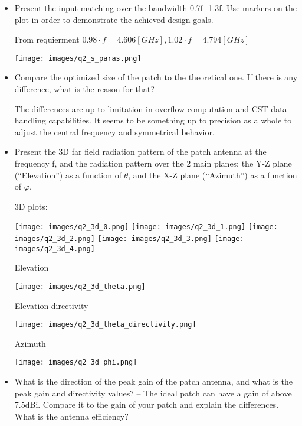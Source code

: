 \documentclass[12pt, letterpaper]{article}
\begin{document}
\begin{itemize}
  \item Present the input matching over the bandwidth 0.7f -1.3f. Use markers on the plot in order to demonstrate the achieved design goals.

  {\color{blue} From requierment $0.98\cdot f=4.606[GHz], 1.02\cdot f=4.794[GHz]$}

  \texttt{[image: images/q2\_s\_paras.png]}
  \item Compare the optimized size of the patch to the theoretical one. If there is any difference, what is the reason for that?

  {\color{blue}The differences are up to limitation in overflow computation and CST data handling capabilities. It seems to be something up to precision as a whole to adjust the central frequency and symmetrical behavior.}
  \item Present the 3D far field radiation pattern of the patch antenna at the frequency f, and the radiation pattern over the 2 main planes: the Y-Z plane (“Elevation”) as a function of $\theta$, and the X-Z plane (“Azimuth”) as a function of $\varphi$.
  
  \begin{center}
    3D plots:
  \end{center}

  \texttt{[image: images/q2\_3d\_0.png]}
  \texttt{[image: images/q2\_3d\_1.png]}
  \texttt{[image: images/q2\_3d\_2.png]}
  \texttt{[image: images/q2\_3d\_3.png]}
  \texttt{[image: images/q2\_3d\_4.png]}

  \pagebreak
  \begin{center}
    Elevation
  \end{center}
  \texttt{[image: images/q2\_3d\_theta.png]}

  \pagebreak
  \begin{center}
    Elevation directivity
  \end{center}
  \texttt{[image: images/q2\_3d\_theta\_directivity.png]}


  \pagebreak
  \begin{center}
    Azimuth
  \end{center}
  \texttt{[image: images/q2\_3d\_phi.png]}
  \item What is the direction of the peak gain of the patch antenna, and what is the peak gain and directivity values? -- The ideal patch can have a gain of above 7.5dBi. Compare it to the gain of your patch and explain the differences. What is the antenna efficiency?


\end{itemize}
\end{document}
